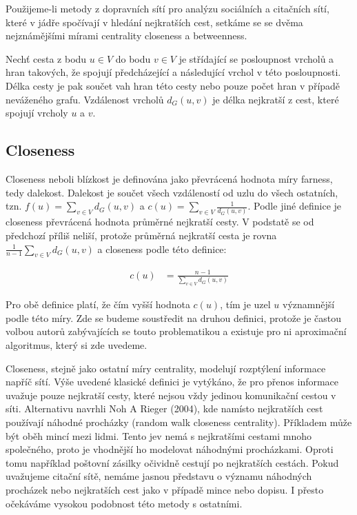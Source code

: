 \documentclass[12pt,titlepage]{report}
\begin{document}
Použijeme-li metody z dopravních sítí pro analýzu sociálních a citačních sítí,
které v jádře spočívají v hledání nejkratších cest, setkáme se se dvěma
nejznámějšími mírami centrality closeness a betweenness.

Nechť cesta z bodu $u \in V$ do bodu $v \in V$ je střídající se posloupnost
vrcholů a hran takových, že spojují předcházející a následující vrchol v této
posloupnosti. Délka cesty je pak součet vah hran této cesty nebo pouze počet
hran v případě neváženého grafu. Vzdálenost vrcholů $d_G(u, v)$ je délka
nejkratší z cest, které spojují vrcholy $u$ a $v$.

\subsection{Closeness}
Closeness neboli blízkost je definována jako převrácená hodnota míry farness,
tedy dalekost. Dalekost je součet všech vzdáleností od uzlu do všech ostatních,
tzn. $f(u) = \sum_{v \in V} d_G(u, v)$ a $c(u) = \sum_{v \in V} \frac{1}{d_G(u,
v)}$. Podle jiné definice je closeness převrácená hodnota průměrné nejkratší
cesty. V podstatě se od předchozí příliš neliší, protože průměrná nejkratší
cesta je rovna $\frac{1}{n
- 1} \sum_{v \in V} d_G(u, v)$ a closeness podle této definice:

\begin{align*}
c(u) &= \frac{n - 1}{\sum_{v \in V} d_G(u, v)}
\end{align*}

Pro obě definice platí, že čím vyšší hodnota $c(u)$, tím je uzel $u$
významnější podle této míry. Zde se budeme soustředit na druhou definici,
protože je častou volbou autorů zabývajících se touto problematikou a existuje
pro ni aproximační algoritmus, který si zde uvedeme.

Closeness, stejně jako ostatní míry centrality, modelují rozptýlení informace
napříč sítí. Výše uvedené klasické definici je vytýkáno, že pro přenos
informace uvažuje pouze nejkratší cesty, které nejsou vždy jedinou komunikační
cestou v síti. Alternativu navrhli Noh A Rieger (2004), kde namísto nejkratších
cest používají náhodné procházky (random walk closeness centrality). Příkladem
může být oběh mincí mezi lidmi. Tento jev nemá s nejkratšími cestami mnoho
společného, proto je vhodnější ho modelovat náhodnými procházkami. Oproti tomu
například poštovní zásilky očividně cestují po nejkratších cestách.  Pokud
uvažujeme citační sítě, nemáme jasnou představu o významu náhodných procházek
nebo nejkratších cest jako v případě mince nebo dopisu. I přesto očekáváme
vysokou podobnost této metody s ostatními.
\end{document}

